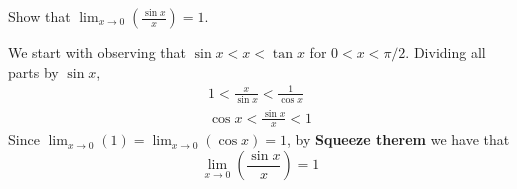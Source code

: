 \documentclass[boxes, qed]{homework}
\begin{document}
\begin{problem}Show that $\displaystyle{\lim_{x \to 0}(\frac{\sin{x}}{x}) = 1}$.
\end{problem}
\begin{solution}We start with observing that $\sin{x}<x<\tan{x}$ for
  $0<x<\pi/2$. Dividing all parts by $\sin{x}$,
  \begin{align*}
    1<\frac{x}{\sin{x}}<\frac{1}{\cos{x}}\\
    \cos{x}<\frac{\sin{x}}{x}<1
  \end{align*}
  Since $\displaystyle{\lim_{x \to 0}(1) = \lim_{x \to 0}(\cos{x}) = 1}$,
  by \textbf{Squeeze therem} we have that 
  $$\displaystyle{\lim_{x \to 0}(\frac{\sin{x}}{x}) = 1}$$
\end{solution}
\end{document}
